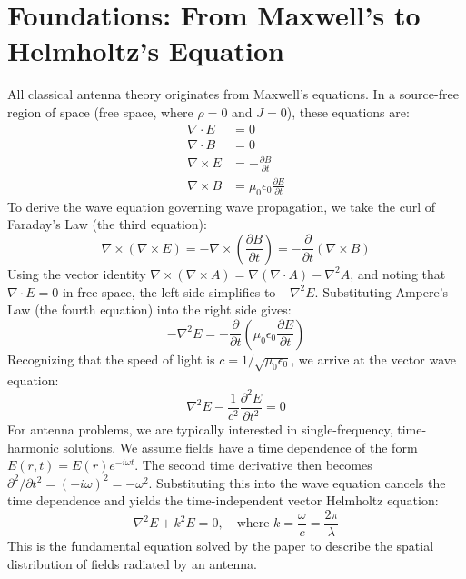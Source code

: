 \documentclass[11pt,a4paper]{article}
\begin{document}
\tableofcontents
\newpage

\section{Foundations: From Maxwell's to Helmholtz's Equation}

All classical antenna theory originates from Maxwell's equations. In a source-free region of space (free space, where \(\rho=0\) and \(J=0\)), these equations are:
\begin{align}
    \nabla\cdot E &= 0 \\
    \nabla\cdot B &= 0 \\
    \nabla\times E &= -\frac{\partial B}{\partial t} \\
    \nabla\times B &= \mu_{0}\epsilon_{0}\frac{\partial E}{\partial t}
\end{align}
To derive the wave equation governing wave propagation, we take the curl of Faraday's Law (the third equation):
\begin{equation}
    \nabla\times(\nabla\times E)=-\nabla\times\left(\frac{\partial B}{\partial t}\right)=-\frac{\partial}{\partial t}(\nabla\times B)
\end{equation}
Using the vector identity \(\nabla\times(\nabla\times A)=\nabla(\nabla\cdot A)-\nabla^{2}A\), and noting that \(\nabla\cdot E=0\) in free space, the left side simplifies to \(-\nabla^{2}E\). Substituting Ampere's Law (the fourth equation) into the right side gives:
\begin{equation}
    -\nabla^{2}E=-\frac{\partial}{\partial t}\left(\mu_{0}\epsilon_{0}\frac{\partial E}{\partial t}\right)
\end{equation}
Recognizing that the speed of light is \(c=1/\sqrt{\mu_{0}\epsilon_{0}}\), we arrive at the vector wave equation:
\begin{equation}
    \nabla^{2}E-\frac{1}{c^{2}}\frac{\partial^{2}E}{\partial t^{2}}=0
\end{equation}
For antenna problems, we are typically interested in single-frequency, time-harmonic solutions. We assume fields have a time dependence of the form \(E(r,t)=E(r)e^{-i\omega t}\). The second time derivative then becomes \(\partial^{2}/\partial t^{2}=(-i\omega)^{2}=-\omega^{2}\). Substituting this into the wave equation cancels the time dependence and yields the time-independent vector Helmholtz equation:
\begin{equation}
    \nabla^{2}E+k^{2}E=0, \quad \text{where } k=\frac{\omega}{c}=\frac{2\pi}{\lambda}
\end{equation}
This is the fundamental equation solved by the paper to describe the spatial distribution of fields radiated by an antenna.
\end{document}
